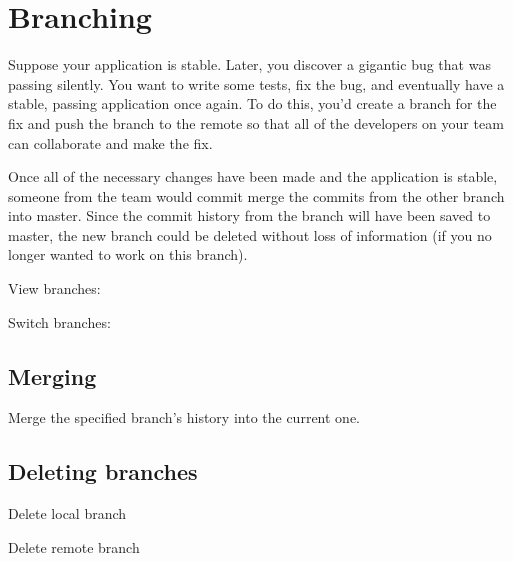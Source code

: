 \section{Branching}

Suppose your application is stable. Later, you discover a gigantic bug that was passing silently. You want to write some tests, fix the bug, and eventually have a stable, passing application once again. To do this, you'd create a branch for the fix and push the branch to the remote so that all of the developers on your team can collaborate and make the fix.  

Once all of the necessary changes have been made and the application is stable, someone from the team would commit merge the commits from the other branch into master. Since the commit history from the branch will have been saved to master, the new branch could be deleted without loss of information (if you no longer wanted to work on this branch).  

View branches: 

Switch branches: 

\subsection{Merging}

Merge the specified branch's history into the current one.

\subsection{Deleting branches}

Delete local branch

Delete remote branch



